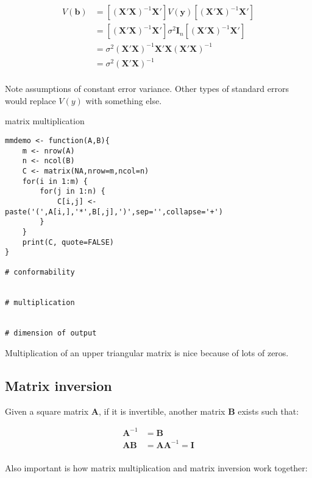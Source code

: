 \documentclass[a4paper,12pt]{article}
\newcommand{\matr}[1]{\mathbf{#1}}
\begin{document}
\begin{align*}
V(\matr{b}) & = \left[(\matr{X}'\matr{X})^{-1}\matr{X}'\right] V(\matr{y}) \left[(\matr{X}'\matr{X})^{-1}\matr{X}'\right] \\
  & = \left[(\matr{X}'\matr{X})^{-1}\matr{X}'\right] \sigma^2 \matr{I}_n \left[(\matr{X}'\matr{X})^{-1}\matr{X}'\right] \\
  & = \sigma^2 (\matr{X}'\matr{X})^{-1}\matr{X}'\matr{X}(\matr{X}'\matr{X})^{-1}\\
  & = \sigma^2 (\matr{X}'\matr{X})^{-1}\\
\end{align*}

Note assumptions of constant error variance. Other types of standard errors would replace $V(y)$ with something else.









matrix multiplication

\begin{lstlisting}
mmdemo <- function(A,B){
    m <- nrow(A)
    n <- ncol(B)
    C <- matrix(NA,nrow=m,ncol=n)
    for(i in 1:m) {
        for(j in 1:n) {
            C[i,j] <- paste('(',A[i,],'*',B[,j],')',sep='',collapse='+')
        }
    }
    print(C, quote=FALSE)
}

# conformability


# multiplication


# dimension of output

\end{lstlisting}


Multiplication of an upper triangular matrix is nice because of lots of zeros.





\subsection{Matrix inversion}

Given a square matrix $\matr{A}$, if it is invertible, another matrix $\matr{B}$ exists such that:

\begin{align*}
\matr{A}^{-1} & = \matr{B}\\
\matr{A}\matr{B} & = \matr{A}\matr{A}^{-1} = \matr{I}\\
\end{align*}

Also important is how matrix multiplication and matrix inversion work together:
\end{document}
